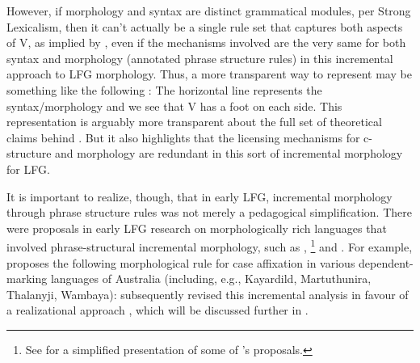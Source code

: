 \documentclass[output=paper,hidelinks]{langscibook}
\begin{document}
However, if morphology and syntax are distinct grammatical modules,
per Strong Lexicalism, then it can't actually be a single rule set
that captures both aspects of V, as implied by , even
if the mechanisms involved are the very same for both syntax and
morphology (annotated phrase structure rules) in this incremental
approach to LFG morphology. Thus, a more transparent way to represent
 may be something like the following \citep[based on][285]{Ishikawa1985}: 
%
%
The horizontal line represents the syntax/morphology 
and we see that V has a foot on each side. This representation is
arguably more transparent about the full set of theoretical claims
behind . But it also highlights that the licensing
mechanisms for c-structure and morphology are redundant in this
sort of incremental morphology for LFG.

It is important to realize, though, that in early LFG, incremental
morphology through phrase structure rules was not merely a pedagogical
simplification. There were proposals in early LFG research on morphologically rich
languages that involved phrase-structural incremental morphology, such
as \citet{baker83}, \citet[ch.\,3]{Ishikawa1985}\footnote{See \citet[396]{BresnanEtAl2016} for
a simplified presentation of some of \citeauthor{Ishikawa1985}'s
proposals.} and \citet{nordlinger97,nordlinger1998constructive}. For example,
\citet[107]{nordlinger97} proposes the following morphological rule
for case affixation in various dependent-marking languages of
Australia (including, e.g.,  Kayardild, Martuthunira, Thalanyji, Wambaya):
%
\ea
{}
\z
%
\citeauthor{nordlinger97} subsequently revised this incremental
analysis in favour of a realizational approach
\citep{sadler-nordlinger2004,SadlNord2006}, which will be
discussed further in .  
\end{document}
